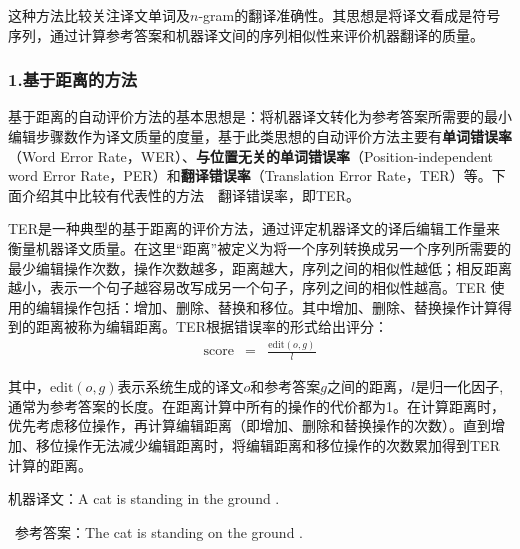 \parinterval 这种方法比较关注译文单词及$n$-gram的翻译准确性。其思想是将译文看成是符号序列，通过计算参考答案和机器译文间的序列相似性来评价机器翻译的质量。


\subsubsection{1.基于距离的方法}

\parinterval 基于距离的自动评价方法的基本思想是：将机器译文转化为参考答案所需要的最小编辑步骤数作为译文质量的度量，基于此类思想的自动评价方法主要有{\small\sffamily\bfseries{单词错误率}}（Word Error Rate，WER）、{\small\sffamily\bfseries{与位置无关的单词错误率}}（Position-independent word Error Rate，PER）和{\small\sffamily\bfseries{翻译错误率}}（Translation Error Rate，TER）等。下面介绍其中比较有代表性的方法\ \dash \ 翻译错误率，即TER。

\parinterval TER是一种典型的基于距离的评价方法，通过评定机器译文的译后编辑工作量来衡量机器译文质量。在这里“距离”被定义为将一个序列转换成另一个序列所需要的最少编辑操作次数，操作次数越多，距离越大，序列之间的相似性越低；相反距离越小，表示一个句子越容易改写成另一个句子，序列之间的相似性越高。TER 使用的编辑操作包括：增加、删除、替换和移位。其中增加、删除、替换操作计算得到的距离被称为编辑距离。TER根据错误率的形式给出评分：
\begin{eqnarray}
\textrm{score}&=& \frac{\textrm{edit}(o,g)}{l}
\label{eq:4-3}
\end{eqnarray}

\noindent 其中，$\textrm{edit}(o,g)$表示系统生成的译文$o$和参考答案$g$之间的距离，$l$是归一化因子,通常为参考答案的长度。在距离计算中所有的操作的代价都为1。在计算距离时，优先考虑移位操作，再计算编辑距离（即增加、删除和替换操作的次数）。直到增加、移位操作无法减少编辑距离时，将编辑距离和移位操作的次数累加得到TER计算的距离。

\begin{example}
机器译文：A cat is standing in the ground .

\qquad\ 参考答案：The cat is standing on the ground .
\label{eg:4-1}
\end{example}

